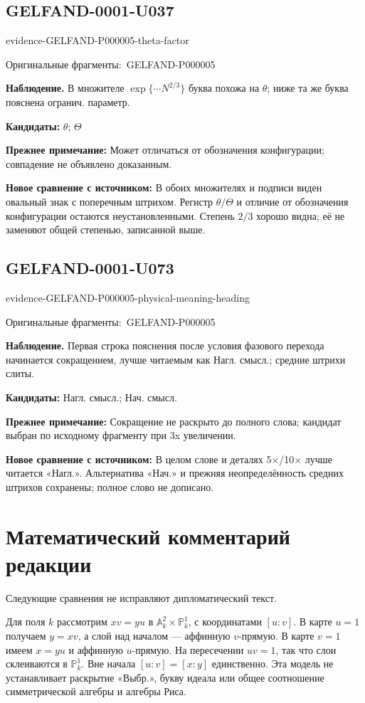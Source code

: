 \documentclass[11pt]{article}
\newcommand{\EvidenceBlock}[4]{%
 \par\smallskip\noindent\begin{minipage}{\linewidth}
 \begin{minipage}[t]{.47\linewidth}\vspace{0pt}\centering
 \csname evidence-#1-#2\endcsname\par
 {\scriptsize\SourceCropCaption\ #1}\par
 \end{minipage}\hfill
 \begin{minipage}[t]{.49\linewidth}\vspace{0pt}\raggedright
 {\small\color{orange!65!black}\textbf{#4} #3}\par
 \end{minipage}
 \end{minipage}\par\smallskip}
\newcommand{\SourceCropCaption}{Оригинальные фрагменты:}\newcommand{\ReadingCaption}{Сомнительное чтение.}\newcommand{\IncompleteCaption}{Неразобранный фрагмент.}\newcommand{\DiagramCaption}{Рисунок и набранное описание.}
\begin{document}
\subsection*{GELFAND-0001-U037}
\EvidenceBlock{GELFAND-P000005}{theta-factor}{В множителе \(\exp\{\cdots N^{2/3}\}\) буква похожа на \(\theta\); ниже та же буква пояснена огранич. параметр.}{Наблюдение.}
\par\smallskip\noindent\textbf{Кандидаты: } \(\theta\); \(\Theta\)\par
\par\smallskip\noindent\textbf{Прежнее примечание: } Может отличаться от обозначения конфигурации; совпадение не объявлено доказанным.\par
\par\smallskip\noindent\textbf{Новое сравнение с источником: } В обоих множителях и подписи виден овальный знак с поперечным штрихом. Регистр \(\theta/\Theta\) и отличие от обозначения конфигурации остаются неустановленными. Степень \(2/3\) хорошо видна; её не заменяют общей степенью, записанной выше.\par

\subsection*{GELFAND-0001-U073}
\EvidenceBlock{GELFAND-P000005}{physical-meaning-heading}{Первая строка пояснения после условия фазового перехода начинается сокращением, лучше читаемым как Нагл. смысл.; средние штрихи слиты.}{Наблюдение.}
\par\smallskip\noindent\textbf{Кандидаты: } Нагл. смысл.; Нач. смысл.\par
\par\smallskip\noindent\textbf{Прежнее примечание: } Сокращение не раскрыто до полного слова; кандидат выбран по исходному фрагменту при 3x увеличении.\par
\par\smallskip\noindent\textbf{Новое сравнение с источником: } В целом слове и деталях 5×/10× лучше читается «Нагл.». Альтернатива «Нач.» и прежняя неопределённость средних штрихов сохранены; полное слово не дописано.\par
\clearpage\section*{Математический комментарий редакции}
Следующие сравнения не исправляют дипломатический текст.

Для поля \(k\) рассмотрим \(xv=yu\) в \(\mathbb A^2_k\times\mathbb P^1_k\), с координатами \([u:v]\). В карте \(u=1\) получаем \(y=xv\), а слой над началом — аффинную \(v\)-прямую. В карте \(v=1\) имеем \(x=yu\) и аффинную \(u\)-прямую. На пересечении \(uv=1\), так что слои склеиваются в \(\mathbb P^1_k\). Вне начала \([u:v]=[x:y]\) единственно. Эта модель не устанавливает раскрытие «Выбр.», букву идеала или общее соотношение симметрической алгебры и алгебры Риса.
\end{document}
